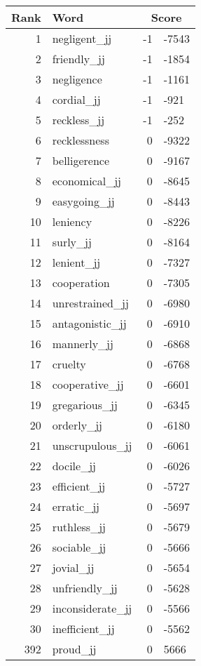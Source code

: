 \begin{longtable}[!htbp]{| rlr@{.}l |}
    \hline
    \textbf{Rank} & \textbf{Word} & \multicolumn{2}{c|}{\textbf{Score}} \\
    \hline
    \endhead
    1 & negligent\_jj & -1 & -7543 \\
    2 & friendly\_jj & -1 & -1854 \\
    3 & negligence & -1 & -1161 \\
    4 & cordial\_jj & -1 & -921 \\
    5 & reckless\_jj & -1 & -252 \\
    6 & recklessness & 0 & -9322 \\
    7 & belligerence & 0 & -9167 \\
    8 & economical\_jj & 0 & -8645 \\
    9 & easygoing\_jj & 0 & -8443 \\
    10 & leniency & 0 & -8226 \\
    11 & surly\_jj & 0 & -8164 \\
    12 & lenient\_jj & 0 & -7327 \\
    13 & cooperation & 0 & -7305 \\
    14 & unrestrained\_jj & 0 & -6980 \\
    15 & antagonistic\_jj & 0 & -6910 \\
    16 & mannerly\_jj & 0 & -6868 \\
    17 & cruelty & 0 & -6768 \\
    18 & cooperative\_jj & 0 & -6601 \\
    19 & gregarious\_jj & 0 & -6345 \\
    20 & orderly\_jj & 0 & -6180 \\
    21 & unscrupulous\_jj & 0 & -6061 \\
    22 & docile\_jj & 0 & -6026 \\
    23 & efficient\_jj & 0 & -5727 \\
    24 & erratic\_jj & 0 & -5697 \\
    25 & ruthless\_jj & 0 & -5679 \\
    26 & sociable\_jj & 0 & -5666 \\
    27 & jovial\_jj & 0 & -5654 \\
    28 & unfriendly\_jj & 0 & -5628 \\
    29 & inconsiderate\_jj & 0 & -5566 \\
    30 & inefficient\_jj & 0 & -5562 \\
    392 & proud\_jj & 0 & 5666 \\

\end{longtable}
